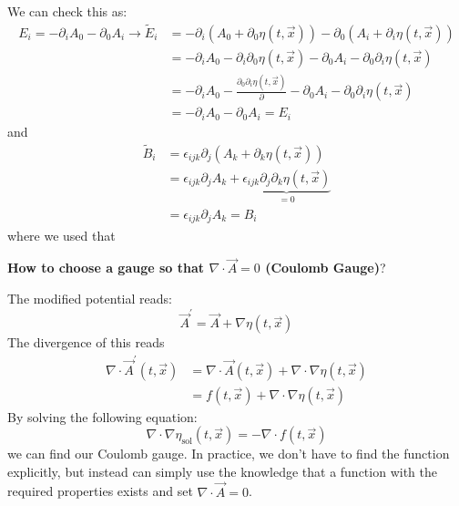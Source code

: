 We can check this as:
$$
\begin{aligned}
E_{i}=-\partial_{i} A_{0}-\partial_{0} A_{i} \rightarrow \tilde{E}_{i} &=-\partial_{i}\left(A_{0}+\partial_{0} \eta(t, \vec{x})\right)-\partial_{0}\left(A_{i}+\partial_{i} \eta(t, \vec{x})\right) \\
&=-\partial_{i} A_{0}-\partial_{i} \partial_{0} \eta(t, \vec{x})-\partial_{0} A_{i}-\partial_{0} \partial_{i} \eta(t, \vec{x}) \\
&=-\partial_{i} A_{0}-\frac{\partial_{0} \partial_{i} \eta(t, \vec{x})}{\partial}-\partial_{0} A_{i}-\partial_{0} \partial_{i} \eta(t, \vec{x}) \\
&=-\partial_{i} A_{0}-\partial_{0} A_{i}=E_i
\end{aligned}
$$
and
$$
\begin{aligned}
\tilde{B}_{i} &=\epsilon_{i j k} \partial_{j}\left(A_{k}+\partial_{k} \eta(t, \vec{x})\right) \\
&=\epsilon_{i j k} \partial_{j} A_{k}+\underbrace{\epsilon_{i j k} \partial_{j} \partial_{k} \eta(t, \vec{x})}_{=0} \\
&=\epsilon_{i j k} \partial_{j} A_{k}=B_i
\end{aligned}
$$
where we used that 
\begin{mybox}
\textbf{How to choose a gauge so that $\nabla \cdot \vec{A}=0$ (Coulomb Gauge)}?
\end{mybox}
\begin{mybox2}
The modified potential reads:
$$
\vec{A}^{\prime}=\vec{A}+\nabla \eta(t, \vec{x})
$$
The divergence of this reads
$$
\begin{aligned}
\nabla \cdot \vec{A}^{\prime}(t, \vec{x}) &=\nabla \cdot \vec{A}(t, \vec{x})+\nabla \cdot \nabla \eta(t, \vec{x}) \\
&=f(t, \vec{x})+\nabla \cdot \nabla \eta(t, \vec{x})
\end{aligned}
$$
By solving the following equation:
$$
\nabla \cdot \nabla \eta_{\mathrm{sol}}(t, \vec{x})=-\nabla \cdot f(t, \vec{x})
$$
we can find our Coulomb gauge. In practice, we don't have to find the function explicitly, but instead can simply use the knowledge that a function with the required properties exists and set $\nabla \cdot \vec{A}=0$.
\end{mybox2}